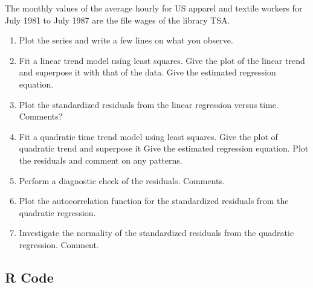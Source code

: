 %

The monthly values of the average hourly for US apparel and textile workers for July 1981 to July 1987 are the file wages of the library TSA. 
\begin{enumerate}[label=(\alph*)]
    \item Plot the series and write a few lines on what you observe.
    \item Fit a linear trend model using least squares. Give the plot of the linear trend and superpose
it with that of the data. Give the estimated regression equation.
    \item Plot the standardized residuals from the linear regression versus time. Comments?
    \item Fit a quadratic time trend model using least squares. Give the plot of quadratic trend and
superpose it Give the estimated regression equation. Plot the residuals and comment on any patterns.
    \item Perform a diagnostic check of the residuals. Comments.
    \item Plot the autocorrelation function for the standardized residuals from the quadratic regression.
    \item Investigate the normality of the standardized residuals from the quadratic regression. Comment.
\end{enumerate}
\subsection{R Code}


